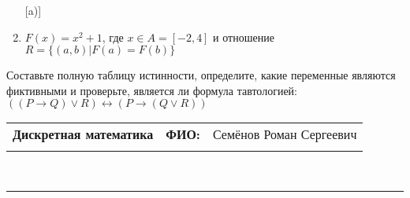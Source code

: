 \documentclass[10pt]{exam}
\newcommand{\class}{Дискретная математика}
\newcommand{\examdate}{}
\begin{document}
\begin{questions}
\begin{enumerate} [a)]
\item $F(x)=x^{2}+1$, где $x \in A = [-2, 4]$ и отношение $R = \{(a,b)|F(a) = F(b)\}$
\end{enumerate}\question Составьте полную таблицу истинности, определите, какие переменные являются фиктивными и проверьте, является ли формула тавтологией:
$((P \rightarrow Q) \lor R) \leftrightarrow (P \rightarrow (Q \lor R))$

\end{questions}
\newpage
\begin{flushright}
\begin{tabular}{p{2.8in} r l}
\textbf{\class} & \textbf{ФИО:} &Семёнов Роман Сергеевич
\\

\textbf{\examdate} &&\\
\end{tabular}\\
\end{flushright}
\rule[1ex]{\textwidth}{.1pt}
\end{document}
